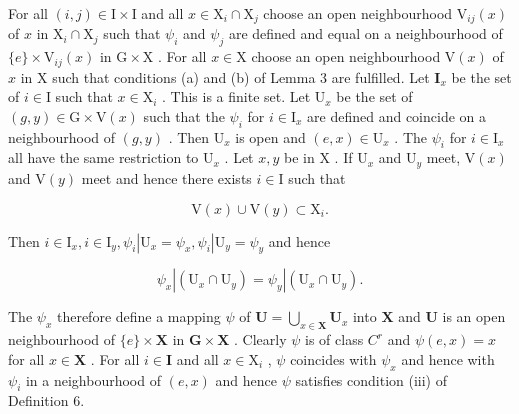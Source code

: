 For all \((i,j)\in \mathrm{I}\times \mathrm{I}\) and all \(x\in \mathrm{X}_i\cap \mathrm{X}_j\) choose an open neighbourhood \(\mathrm{V}_{ij}(x)\) of \(x\) in \(\mathrm{X}_i\cap \mathrm{X}_j\) such that \(\psi_i\) and \(\psi_j\) are defined and equal on a neighbourhood of \(\{e\} \times \mathrm{V}_{ij}(x)\) in \(\mathrm{G}\times \mathrm{X}\) . For all \(x\in \mathrm{X}\) choose an open neighbourhood \(\mathrm{V}(x)\) of \(x\) in \(\mathrm{X}\) such that conditions (a) and (b) of Lemma 3 are fulfilled. Let \(\mathbf{I}_x\) be the set of \(i\in \mathrm{I}\) such that \(x\in \mathrm{X}_i\) . This is a finite set. Let \(\mathrm{U}_x\) be the set of \((g,y)\in \mathrm{G}\times \mathrm{V}(x)\) such that the \(\psi_i\) for \(i\in \mathrm{I}_x\) are defined and coincide on a neighbourhood of \((g,y)\) . Then \(\mathrm{U}_x\) is open and \((e,x)\in \mathrm{U}_x\) . The \(\psi_i\) for \(i\in \mathrm{I}_x\) all have the same restriction to \(\mathrm{U}_x\) . Let \(x,y\) be in \(\mathrm{X}\) . If \(\mathrm{U}_x\) and \(\mathrm{U}_y\) meet, \(\mathrm{V}(x)\) and \(\mathrm{V}(y)\) meet and hence there exists \(i\in \mathrm{I}\) such that

\[
\mathrm{V} (x) \cup \mathrm{V} (y) \subset \mathrm{X} _ {i}.
\]

Then \(i \in \mathrm{I}_x, i \in \mathrm{I}_y, \psi_i | \mathrm{U}_x = \psi_x, \psi_i | \mathrm{U}_y = \psi_y\) and hence

\[
\psi_ {x} | (\mathrm{U} _ {x} \cap \mathrm{U} _ {y}) = \psi_ {y} | (\mathrm{U} _ {x} \cap \mathrm{U} _ {y}).
\]

The \(\psi_x\) therefore define a mapping \(\psi\) of \(\mathbf{U} = \bigcup_{x\in \mathbf{X}}\mathbf{U}_x\) into \(\mathbf{X}\) and \(\mathbf{U}\) is an open neighbourhood of \(\{e\} \times \mathbf{X}\) in \(\mathbf{G}\times \mathbf{X}\) . Clearly \(\psi\) is of class \(C^r\) and \(\psi (e,x) = x\) for all \(x\in \mathbf{X}\) . For all \(i\in \mathbf{I}\) and all \(x\in \mathrm{X}_i\) , \(\psi\) coincides with \(\psi_x\) and hence with \(\psi_i\) in a neighbourhood of \((e,x)\) and hence \(\psi\) satisfies condition (iii) of Definition 6.

